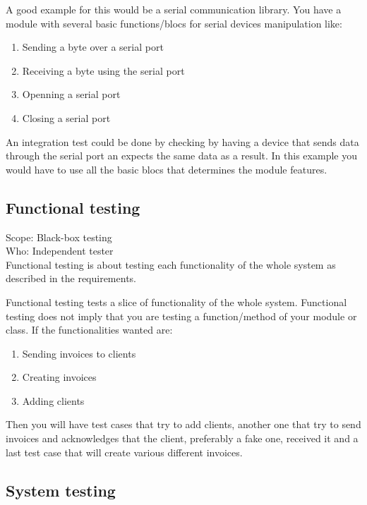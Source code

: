 \documentclass[12pt]{article}
\theoremstyle{definition}
\theoremstyle{definition}
\theoremstyle{remark}
\begin{document}
A good example for this would be a serial communication library. You have a module with several basic functions/blocs for serial devices manipulation like:
\begin{enumerate}
\item Sending a byte over a serial port
\item Receiving a byte using the serial port
\item Openning a serial port
\item Closing a serial port
\end{enumerate}

An integration test could be done by checking by having a device that sends data through the serial port an expects the same data as a result. In this example you would have to use all the basic blocs that determines the module features.


\subsection{Functional testing}

Scope: Black-box testing\\
Who: Independent tester\\

Functional testing is about testing each functionality of the whole system as described in the requirements.

Functional testing tests a slice of functionality of the whole system. Functional testing does not imply that you are testing a function/method of your module or class. If the functionalities wanted are:
\begin{enumerate}
\item Sending invoices to clients
\item Creating invoices
\item Adding clients
\end{enumerate}

Then you will have test cases that try to add clients, another one that try to send invoices and acknowledges that the client, preferably a fake one, received it and a last test case that will create various different invoices.


\subsection{System testing}
\end{document}

